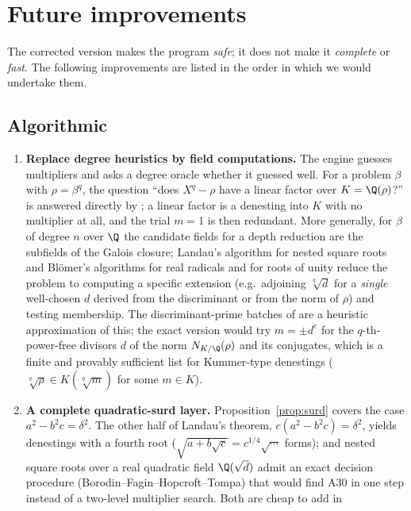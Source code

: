 \section{Future improvements}
\label{sec:future}
The corrected version makes the program \emph{safe}; it does not make it
\emph{complete} or \emph{fast}. The following improvements are listed in the
order in which we would undertake them.

\subsection{Algorithmic}
\begin{enumerate}
\item \textbf{Replace degree heuristics by field computations.} The engine
      guesses multipliers and asks a degree oracle whether it guessed well.
      For a problem $\beta$ with $\rho=\beta^q$, the question ``does
      $X^q-\rho$ have a linear factor over $K=\Q(\rho)$?'' is answered directly
      by ; a linear factor is
      a denesting into $K$ with no multiplier at all, and the trial $m=1$ is
      then redundant. More generally, for $\beta$ of degree $n$ over $\Q$ the
      candidate fields for a depth reduction are the subfields of the Galois
      closure; Landau's algorithm for nested square roots and Blömer's
      algorithms for real radicals and for roots of unity reduce the problem
      to computing a specific extension (e.g.\ adjoining $\sqrt[q]{d}$ for a
      \emph{single} well-chosen $d$ derived from the discriminant or from the
      norm of $\rho$) and testing membership. The discriminant-prime batches
      of  are a heuristic approximation of this; the
      exact version would try $m=\pm d^{e}$ for the $q$-th-power-free
      divisors $d$ of the norm $N_{K/\Q}(\rho)$ and its conjugates, which is a
      finite and provably sufficient list for Kummer-type denestings
      ($\sqrt[q]{\rho}\in K(\sqrt[q]{m})$ for some $m\in K$).
\item \textbf{A complete quadratic-surd layer.} Proposition~\ref{prop:surd}
      covers the case $a^2-b^2c=\delta^2$. The other half of Landau's theorem,
      $c(a^2-b^2c)=\delta^2$, yields denestings with a fourth root
      ($\sqrt{a+b\sqrt c}=c^{1/4}\sqrt{\cdots}$ forms); and nested square roots
      over a real quadratic field $\Q(\sqrt d)$ admit an exact decision
      procedure (Borodin--Fagin--Hopcroft--Tompa) that would find A30 in one
      step instead of a two-level multiplier search. Both are cheap to add in

\end{enumerate}
